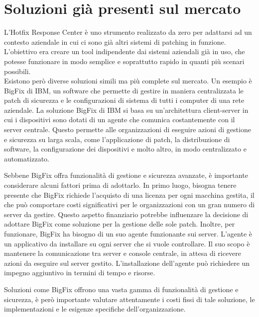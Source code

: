 
\section{Soluzioni già presenti sul mercato}
L'Hotfix Response Center è uno strumento realizzato da zero per adattarsi ad un 
contesto aziendale in cui ci sono già altri sistemi di patching in funzione. 
L'obiettivo era creare un tool indipendente dai sistemi aziendali già in uso, 
che potesse funzionare in modo semplice e soprattutto rapido in quanti più 
scenari possibili.\\

Esistono però diverse soluzioni simili ma più complete sul mercato. Un esempio è 
BigFix di IBM, un software che permette di gestire in maniera centralizzata 
le patch di sicurezza e le configurazioni di sistema di tutti i computer di una 
rete aziendale.
La soluzione BigFix di IBM si basa su un'architettura client-server in cui i 
dispositivi sono dotati di un agente che comunica costantemente con il server 
centrale. Questo permette alle organizzazioni di eseguire azioni di gestione e 
sicurezza su larga scala, come l'applicazione di patch, la distribuzione di software, 
la configurazione dei dispositivi e molto altro, in modo centralizzato e 
automatizzato. ~\cite{ibm:bigfix}

Sebbene BigFix offra funzionalità di gestione e sicurezza avanzate, è importante 
considerare alcuni fattori prima di adottarlo. In primo luogo, bisogna tenere 
presente che BigFix richiede l'acquisto di una licenza per ogni macchina gestita, 
il che può comportare costi significativi per le organizzazioni con un gran numero 
di server da gestire. Questo aspetto finanziario potrebbe influenzare la decisione 
di adottare BigFix come soluzione per la gestione delle sole patch.
Inoltre, per funzionare, BigFix ha bisogno di un suo agente funzionante sui server. 
L’agente è un applicativo da installare su ogni server che si vuole controllare. 
Il suo scopo è mantenere la comunicazione tra server e console centrale, in attesa 
di ricevere azioni da eseguire sul server gestito. L’installazione dell’agente può 
richiedere un impegno aggiuntivo in termini di tempo e risorse.

Soluzioni come BigFix offrono una vasta gamma di funzionalità di gestione e sicurezza, 
è però importante valutare attentamente i costi fissi di tale soluzione, le 
implementazioni e le esigenze specifiche dell'organizzazione.\\ 

